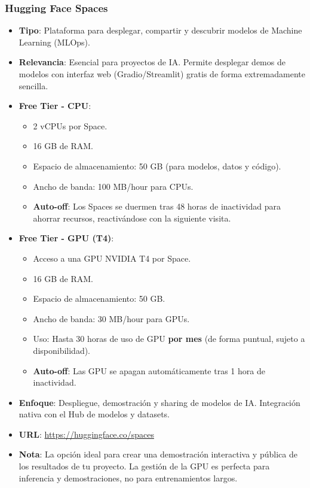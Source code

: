 \subsubsection*{Hugging Face Spaces}
\begin{itemize}
	\item \textbf{Tipo}: Plataforma para desplegar, compartir y descubrir modelos de Machine Learning (MLOps).
	\item \textbf{Relevancia}: Esencial para proyectos de IA. Permite desplegar demos de modelos con interfaz web (Gradio/Streamlit) gratis de forma extremadamente sencilla.
	\item \textbf{Free Tier - CPU}: 
	\begin{itemize}
		\item 2 vCPUs por Space.
		\item 16 GB de RAM.
		\item Espacio de almacenamiento: 50 GB (para modelos, datos y código).
		\item Ancho de banda: 100 MB/hour para CPUs.
		\item \textbf{Auto-off}: Los Spaces se duermen tras 48 horas de inactividad para ahorrar recursos, reactivándose con la siguiente visita.
	\end{itemize}
	\item \textbf{Free Tier - GPU (T4)}: 
	\begin{itemize}
		\item Acceso a una GPU NVIDIA T4 por Space.
		\item 16 GB de RAM.
		\item Espacio de almacenamiento: 50 GB.
		\item Ancho de banda: 30 MB/hour para GPUs.
		\item Uso: Hasta 30 horas de uso de GPU \textbf{por mes} (de forma puntual, sujeto a disponibilidad).
		\item \textbf{Auto-off}: Las GPU se apagan automáticamente tras 1 hora de inactividad.
	\end{itemize}
	\item \textbf{Enfoque}: Despliegue, demostración y sharing de modelos de IA. Integración nativa con el Hub de modelos y datasets.
	\item \textbf{URL}: \url{https://huggingface.co/spaces}
	\item \textbf{Nota}: La opción ideal para crear una demostración interactiva y pública de los resultados de tu proyecto. La gestión de la GPU es perfecta para inferencia y demostraciones, no para entrenamientos largos.
\end{itemize}


